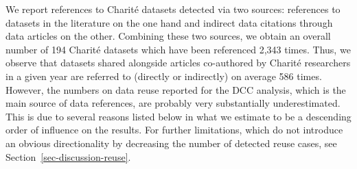 \documentclass[
  letterpaper,
  DIV=11,
  numbers=noendperiod]{scrartcl}
\begin{document}
We report references to Charité datasets detected via two sources:
references to datasets in the literature on the one hand and indirect
data citations through data articles on the other. Combining these two
sources, we obtain an overall number of 194 Charité datasets which have
been referenced 2,343 times. Thus, we observe that datasets shared
alongside articles co-authored by Charité researchers in a given year
are referred to (directly or indirectly) on average 586 times. However,
the numbers on data reuse reported for the DCC analysis, which is the
main source of data references, are probably very substantially
underestimated. This is due to several reasons listed below in what we
estimate to be a descending order of influence on the results. For
further limitations, which do not introduce an obvious directionality by
decreasing the number of detected reuse cases, see
Section~\ref{sec-discussion-reuse}.
\end{document}
